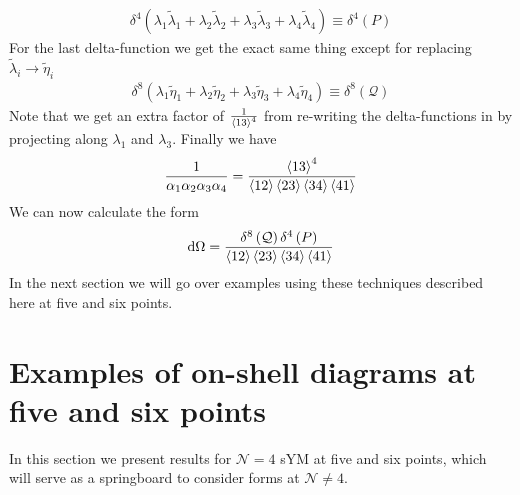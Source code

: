 \documentclass[letter,11pt]{article}
\begin{document}
\begin{equation}
	\begin{aligned}
		\delta^{4}(\lambda_1\tilde\lambda_1+\lambda_2\tilde\lambda_2+\lambda_3\tilde\lambda_3+\lambda_4\tilde\lambda_4)\equiv \delta^{4}\left(P\right)
	\end{aligned}
\end{equation}
For the last delta-function we get the exact same thing except for replacing $\tilde \lambda_i\to \tilde \eta_i$
\begin{equation}
	\begin{aligned}
		\delta^{8}(\lambda_1\tilde\eta_1+\lambda_2\tilde\eta_2+\lambda_3\tilde\eta_3+\lambda_4\tilde\eta_4)\equiv \delta^{8}\left(\mathcal{Q}\right)
	\end{aligned}
\end{equation}
Note that we get an extra factor of $\frac{1}{\expval{13}^4}$ from re-writing the delta-functions in by projecting along $\lambda_1$ and $\lambda_3$.
 Finally we have
\begin{equation}
	\begin{aligned}
		\frac{1}{\alpha_1 \alpha_2 \alpha_3 \alpha_4}=\frac{\expval{13}^4}{\expval{12}\expval{23}\expval{34}\expval{41}}
	\end{aligned}
\end{equation}
We can now calculate the form
\begin{equation}
	\begin{aligned}
		\dd \Omega =
		\frac{\delta^{8}\left(\mathcal{Q}\right)\delta^{4}\left(P\right)}{\expval{12}\expval{23}\expval{34}\expval{41}}
	\end{aligned}
\end{equation}
In the next section we will go over examples using these techniques described here at five and six points.
\newpage
\section{Examples of on-shell diagrams at five and six points\label{sec:examples}}
In this section we present results for $\mathcal{N}=4$ sYM at five and six points, which will serve as a springboard to consider forms at $\mathcal{N}\neq 4$.
\end{document}
